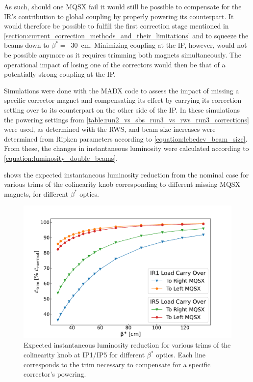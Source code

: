 As such, should one MQSX fail it would still be possible to compensate for the \gls{IR}'s contribution to global coupling by properly powering its counterpart.
It would therefore be possible to fulfill the first correction stage mentioned in \cref{section:current_correction_methods_and_their_limitations} and to squeeze the beams down to \(\beta^{\ast} =\)~\qty{30}{\centi\meter}.
Minimizing coupling at the IP, however, would not be possible anymore as it requires trimming both magnets simultaneously.
The operational impact of losing one of the correctors would then be that of a potentially strong coupling at the IP.

Simulations were done with the \gls{MADX} code to assess the impact of missing a specific corrector magnet and compensating its effect by carrying its correction setting over to its counterpart on the other side of the IP.
In these simulations the powering settings from \cref{table:run2_vs_sbs_run3_vs_rws_run3_corrections} were used, as determined with the \gls{RWS}, and beam size increases were determined from Ripken parameters according to \cref{equation:lebedev_beam_size}.
From these, the changes in instantaneous luminosity were calculated according to \cref{equation:luminosity_double_beams}.

 shows the expected instantaneous luminosity reduction from the nominal case for various trims of the colinearity knob corresponding to different missing MQSX magnets, for different \(\beta^{\ast}\) optics.

\begin{figure}[!htb]
    \centering
    \includegraphics*[width=\textwidth]{Figures/IR_Coupling_Correction/lumi_vs_betastars_colin_trims.pdf}
    \caption{Expected instantaneous luminosity reduction for various trims of the colinearity knob at IP\num{1}/IP\num{5} for different \(\beta^{\ast}\) optics. Each line corresponds to the trim necessary to compensate for a specific corrector's powering.}
    \label{figure:lumi_vs_trims_vs_betastars}
\end{figure}

